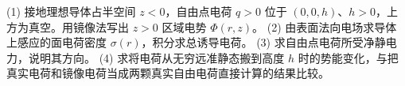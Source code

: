 (1) 接地理想导体占半空间 \(z<0\)，自由点电荷 \(q>0\) 位于 \((0,0,h)\)、\(h>0\)，上方为真空。用镜像法写出 \(z>0\) 区域电势 \(\Phi(r,z)\)。
(2) 由表面法向电场求导体上感应的面电荷密度 \(\sigma(r)\)，积分求总诱导电荷。
(3) 求自由点电荷所受净静电力，说明其方向。
(4) 求将电荷从无穷远准静态搬到高度 \(h\) 时的势能变化，与把真实电荷和镜像电荷当成两颗真实自由电荷直接计算的结果比较。
